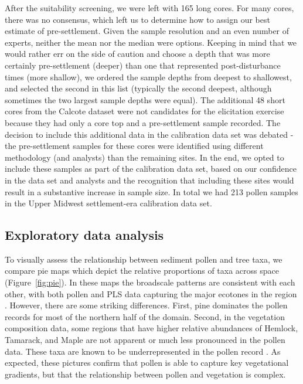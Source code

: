 \documentclass[12pt]{article}
\begin{document}
After the suitability screening, we were left with 165 long cores. For
many cores, there was no consensus, which left us to determine how to
assign our best estimate of pre-settlement. Given the sample
resolution and an even number of experts, neither the mean nor the
median were options. Keeping in mind that we would rather err on the
side of caution and choose a depth that was more certainly
pre-settlement (deeper) than one that represented post-disturbance
times (more shallow), we ordered the sample depths from deepest to
shallowest, and selected the second in this list (typically the second
deepest, although sometimes the two largest sample depths were equal).
The additional 48 short cores from the Calcote dataset were not
candidates for the elicitation exercise because they had only a core
top and a pre-settlement sample recorded. The decision to include this
additional data in the calibration data set was debated - the
pre-settlement samples for these cores were identified using different
methodology (and analysts) than the remaining sites. In the end, we
opted to include these samples as part of the calibration data set,
based on our confidence in the data set and analysts and the
recognition that including these sites would result in a substantive
increase in sample size. In total we had 213 pollen samples in the
Upper Midwest settlement-era calibration data set.

\subsection{Exploratory data analysis}

To visually assess the relationship between sediment pollen and tree
taxa, we compare pie maps which depict the relative proportions of
taxa across space (Figure~\ref{fig:pie}). In these maps the broadscale
patterns are consistent with each other, with both pollen and PLS data
capturing the major ecotones in the region
\citep{solomon1985computer}.  However, there are some striking
differences. First, pine dominates the pollen records for most of the
northern half of the domain. Second, in the vegetation composition
data, some regions that have higher relative abundances of Hemlock,
Tamarack, and Maple are not apparent or much less pronounced in the
pollen data. These taxa are known to be underrepresented in the pollen
record \citep{XXX}. As expected, these pictures confirm that pollen is able
to capture key vegetational gradients, but that the relationship
between pollen and vegetation is complex.
\end{document}
